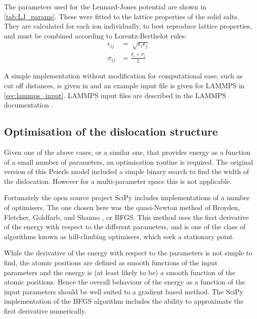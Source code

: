 The parameters used for the Lennard-Jones potential are shown in \autoref{tab:LJ_params}. These were fitted to the lattice properties of the solid salts. They are calculated for each ion individually, to best reproduce lattice properties, and must be combined according to Lorentz-Berthelot rules:
\begin{align}
\epsilon_{ij} &= \sqrt[]{\epsilon_i \epsilon_j} \nonumber\\
\sigma_{ij} &= \frac{\sigma_i + \sigma_j}{2}
\end{align}

A simple implementation without modification for computational ease, such as cut off distances, is given in \cite{code} and an example input file is given for LAMMPS in \autoref{sec:lammps_input}. LAMMPS  input files are described in the LAMMPS documentation \cite{LAMMPS_web}.

\subsection{Optimisation of the dislocation structure}
\label{sec:optimisers}


Given one of the above cases, or a similar one, that provides energy as a function of a small number of parameters, an optimisation routine is required. The original version of this Peierls model \cite{Clegg2006} included a simple binary search to find the width of the dislocation. However for a multi-parameter space this is not applicable.

Fortunately the open source project SciPy includes implementations of a number of optimisers. The one chosen here was the quasi-Newton method of Broyden, Fletcher, Goldfarb, and Shanno \citep{SciPy2001,nocedal2006}, or BFGS. This method uses the first derivative of the energy with respect to the different parameters, and is one of the class of algorithms known as hill-climbing optimisers, which seek a stationary point.

While the derivative of the energy with respect to the parameters is not simple to find, the atomic positions are defined as smooth functions of the input parameters and the energy is (at least likely to be) a smooth function of the atomic positions. Hence the overall behaviour of the energy as a function of the input parameters should be well suited to a gradient based method. The SciPy implementation of the BFGS algorithm includes the ability to approximate the first derivative numerically.


